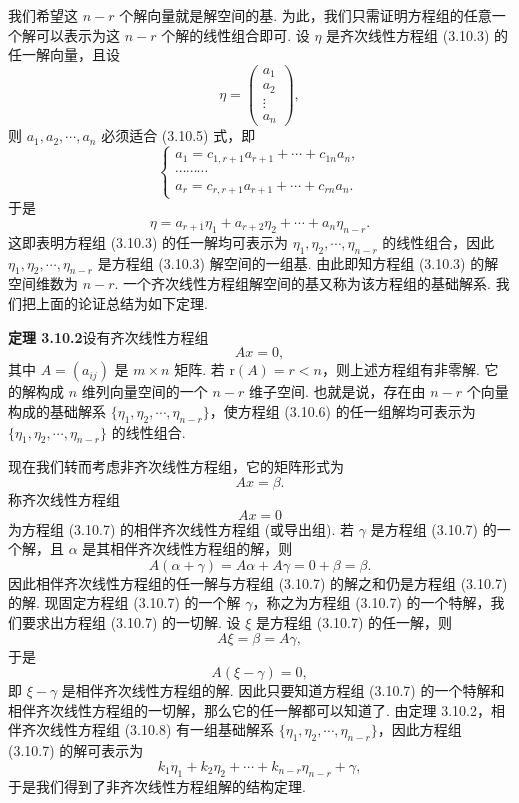 \documentclass[UTF8, 12pt, fontset=fandol, oneside]{ctexart}
\begin{document}
我们希望这 $n-r$ 个解向量就是解空间的基. 为此，我们只需证明方程组的任意一个解可以表示为这 $n-r$ 个解的线性组合即可. 设 $\eta$ 是齐次线性方程组 (3.10.3) 的任一解向量，且设
\[
\eta=\left(\begin{array}{c}
a_1\\
a_2\\
\vdots\\
a_n
\end{array}\right),
\]
则 $a_1,a_2,\cdots,a_n$ 必须适合 (3.10.5) 式，即
\[
\left\{\begin{array}{c}
a_1=c_{1,r+1}a_{r+1}+\cdots+c_{1n}a_n,\\
\cdots\cdots\cdots\\
a_r=c_{r,r+1}a_{r+1}+\cdots+c_{rn}a_n.
\end{array}\right.
\]
于是
\[
\eta=a_{r+1}\eta_1+a_{r+2}\eta_2+\cdots+a_n\eta_{n-r}.
\]
这即表明方程组 (3.10.3) 的任一解均可表示为 $\eta_1,\eta_2,\cdots,\eta_{n-r}$ 的线性组合，因此 $\eta_1,\eta_2,\cdots,\eta_{n-r}$ 是方程组 (3.10.3) 解空间的一组基. 由此即知方程组 (3.10.3) 的解空间维数为 $n-r$. 一个齐次线性方程组解空间的基又称为该方程组的基础解系. 我们把上面的论证总结为如下定理.

\noindent\textbf{定理 3.10.2}\quad 设有齐次线性方程组
\begin{equation}
Ax=0,
\tag{3.10.6}
\end{equation}
其中 $A=(a_{ij})$ 是 $m\times n$ 矩阵. 若 $\mathrm{r}(A)=r<n$，则上述方程组有非零解. 它的解构成 $n$ 维列向量空间的一个 $n-r$ 维子空间. 也就是说，存在由 $n-r$ 个向量构成的基础解系 $\{\eta_1,\eta_2,\cdots,\eta_{n-r}\}$，使方程组 (3.10.6) 的任一组解均可表示为 $\{\eta_1,\eta_2,\cdots,\eta_{n-r}\}$ 的线性组合.

现在我们转而考虑非齐次线性方程组，它的矩阵形式为
\begin{equation}
Ax=\beta.
\tag{3.10.7}
\end{equation}
称齐次线性方程组
\begin{equation}
Ax=0
\tag{3.10.8}
\end{equation}
为方程组 (3.10.7) 的相伴齐次线性方程组 (或导出组). 若 $\gamma$ 是方程组 (3.10.7) 的一个解，且 $\alpha$ 是其相伴齐次线性方程组的解，则
\[
A(\alpha+\gamma)=A\alpha+A\gamma=0+\beta=\beta.
\]
因此相伴齐次线性方程组的任一解与方程组 (3.10.7) 的解之和仍是方程组 (3.10.7) 的解. 现固定方程组 (3.10.7) 的一个解 $\gamma$，称之为方程组 (3.10.7) 的一个特解，我们要求出方程组 (3.10.7) 的一切解. 设 $\xi$ 是方程组 (3.10.7) 的任一解，则
\[
A\xi=\beta=A\gamma,
\]
于是
\[
A(\xi-\gamma)=0,
\]
即 $\xi-\gamma$ 是相伴齐次线性方程组的解. 因此只要知道方程组 (3.10.7) 的一个特解和相伴齐次线性方程组的一切解，那么它的任一解都可以知道了. 由定理 3.10.2，相伴齐次线性方程组 (3.10.8) 有一组基础解系 $\{\eta_1,\eta_2,\cdots,\eta_{n-r}\}$，因此方程组 (3.10.7) 的解可表示为
\[
k_1\eta_1+k_2\eta_2+\cdots+k_{n-r}\eta_{n-r}+\gamma,
\]
于是我们得到了非齐次线性方程组解的结构定理.
\end{document}
